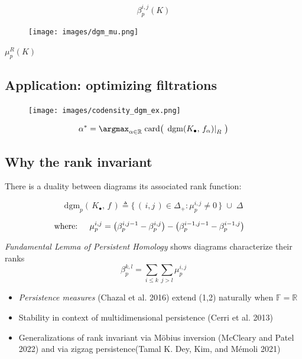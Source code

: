 \documentclass[
  letterpaper,
  DIV=11,
  numbers=noendperiod,
  oneside]{scrartcl}
\providecommand{\tightlist}{%
  \setlength{\itemsep}{0pt}\setlength{\parskip}{0pt}}\usepackage{longtable,booktabs,array}
\begin{document}
\[ \beta_p^{i,j}(K)\]

\begin{figure}

{\centering \texttt{[image: images/dgm\_mu.png]}

}

\end{figure}

\(\mu_p^R(K)\)

\subsection{Application: optimizing
filtrations}\label{application-optimizing-filtrations}

\begin{figure}

{\centering \texttt{[image: images/codensity\_dgm\_ex.png]}

}

\end{figure}

\[ \alpha^\ast = \argmax_{\alpha \in \mathbb{R}} \; \mathrm{card}\big(\, \left.\mathrm{dgm}(K_\bullet, \, f_\alpha) \right|_{R} \, \big) \]

\subsection{Why the rank invariant}\label{why-the-rank-invariant}

There is a duality between diagrams its associated rank function:

\[ \mathrm{dgm}_p(\, K_\bullet, \, f \, ) \triangleq \{ \, ( \, i, j \,) \in \Delta_+ :  \mu_p^{i,j} \neq 0 \, \} \; \cup \; \Delta \]

\[\text{where: } \quad \mu_p^{i,j} = \left(\beta_p^{i,j{\small -}1} - \beta_p^{i,j} \right) - \left(\beta_p^{i{\small -}1,j{\small -}1} - \beta_p^{i{\small -}1,j} \right) \quad \]

\emph{Fundamental Lemma of Persistent Homology} shows diagrams
characterize their ranks
\[\beta_p^{k,l} = \sum\limits_{i \leq k} \sum\limits_{j > l} \mu_p^{i,j}\]

\begin{itemize}
\tightlist
\item
  \emph{Persistence measures} (Chazal et al. 2016) extend (1,2)
  naturally when \(\mathbb{F} = \mathbb{R}\)
\item
  Stability in context of multidimensional persistence (Cerri et al.
  2013)
\item
  Generalizations of rank invariant via Möbius inversion (McCleary and
  Patel 2022) and via zigzag persistence(Tamal K. Dey, Kim, and Mémoli
  2021)
\end{itemize}
\end{document}
